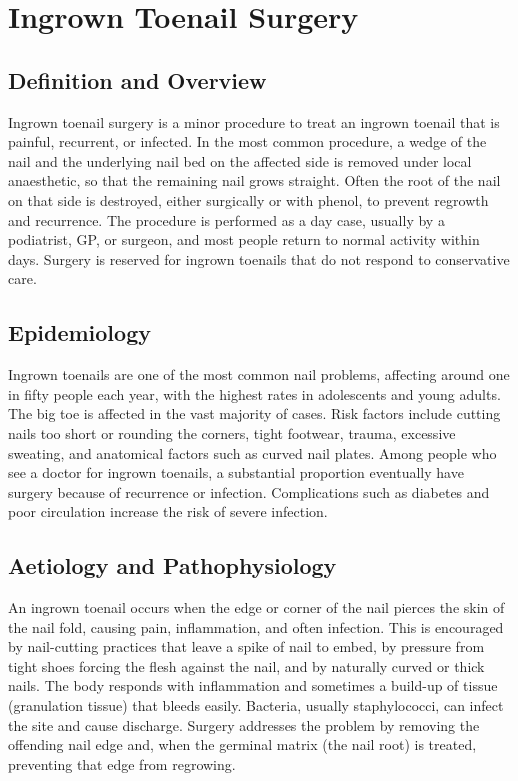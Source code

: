 \chapter{Ingrown Toenail Surgery}

\section*{Definition and Overview}
Ingrown toenail surgery is a minor procedure to treat an ingrown toenail that is painful, recurrent, or infected. In the most common procedure, a wedge of the nail and the underlying nail bed on the affected side is removed under local anaesthetic, so that the remaining nail grows straight. Often the root of the nail on that side is destroyed, either surgically or with phenol, to prevent regrowth and recurrence. The procedure is performed as a day case, usually by a podiatrist, GP, or surgeon, and most people return to normal activity within days. Surgery is reserved for ingrown toenails that do not respond to conservative care.

\section*{Epidemiology}
Ingrown toenails are one of the most common nail problems, affecting around one in fifty people each year, with the highest rates in adolescents and young adults. The big toe is affected in the vast majority of cases. Risk factors include cutting nails too short or rounding the corners, tight footwear, trauma, excessive sweating, and anatomical factors such as curved nail plates. Among people who see a doctor for ingrown toenails, a substantial proportion eventually have surgery because of recurrence or infection. Complications such as diabetes and poor circulation increase the risk of severe infection.

\section*{Aetiology and Pathophysiology}
An ingrown toenail occurs when the edge or corner of the nail pierces the skin of the nail fold, causing pain, inflammation, and often infection. This is encouraged by nail-cutting practices that leave a spike of nail to embed, by pressure from tight shoes forcing the flesh against the nail, and by naturally curved or thick nails. The body responds with inflammation and sometimes a build-up of tissue (granulation tissue) that bleeds easily. Bacteria, usually staphylococci, can infect the site and cause discharge. Surgery addresses the problem by removing the offending nail edge and, when the germinal matrix (the nail root) is treated, preventing that edge from regrowing.

